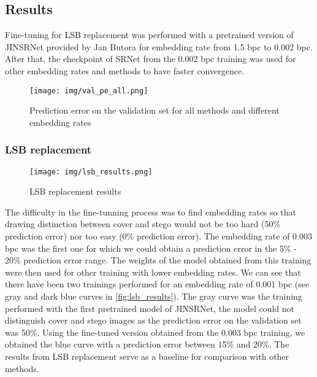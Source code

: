 \documentclass[12pt]{article}
\begin{document}
\subsection{Results}
Fine-tuning for LSB replacement was performed with a pretrained version of JINSRNet provided by Jan Butora for embedding rate from 1.5 bpc to 0.002 bpc. After that, the checkpoint of SRNet from the 0.002 bpc training  was used for other embedding rates and methods to have faster convergence.
\begin{figure}[H]
    \texttt{[image: img/val\_pe\_all.png]}
    \caption[Steganalysis results]{Prediction error on the validation set for all methods and 
    different embedding rates}
    \label{fig:results}
\end{figure}

\subsubsection{LSB replacement}
\begin{figure}[H]
    \texttt{[image: img/lsb\_results.png]}
    \caption[LSB replacement result]{LSB replacement results}
    \label{fig:lsb_results}
\end{figure}
The difficulty in the fine-tunning process was to find embedding rates so that drawing distinction between cover and stego would not be too hard (50\% prediction error) nor too easy (0\% prediction error). The embedding rate of 0.003 bpc was the first one for which we could obtain a prediction error in the 5\% - 20\% prediction error range. The weights of the model obtained from this training were then used for other training with lower embedding rates. We can see that there have been two trainings performed for an embedding rate of 0.001 bpc (see gray and dark blue curves in \autoref{fig:lsb_results}). The gray curve was the training performed with the first pretrained model of JINSRNet, the model could not distinguish cover and stego images as the prediction error on the validation set was 50\%. Using the fine-tuned version obtained from the 0.003 bpc training, we obtained the blue curve with a prediction error between 15\% and 20\%. The results from LSB replacement serve as a baseline for comparison with other methods.
\end{document}
